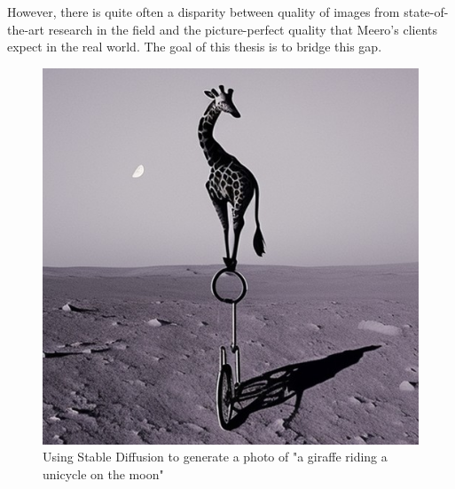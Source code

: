 However, there
is quite often a disparity between quality of images from state-of-the-art research in the field and the picture-perfect quality that 
Meero's clients expect in the real world. The goal of this thesis is to bridge this gap. 

\begin{figure}[tb]
      \begin{center}
          \includegraphics[width=0.5\linewidth]{images/intro/giraffe.png}
      \end{center}
      \caption{Using Stable Diffusion to generate a photo of "a giraffe riding a unicycle on the moon"}
      \label{fig:diffusion_example}
  \end{figure}



